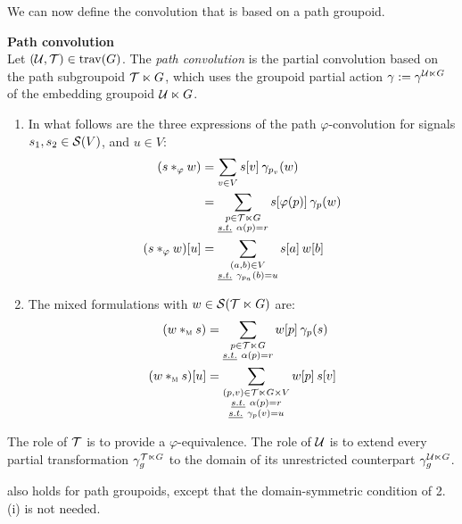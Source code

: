 We can now define the convolution that is based on a path groupoid.

\begin{definition}\textbf{Path convolution}\\
Let $(\cu, \ct) \in \tree(G)$. The \emph{path convolution} is the partial convolution based on the path subgroupoid $\ct \ltimes G$, which uses the groupoid partial action $\gamma := \gamma^{\cu \ltimes G}$ of the embedding groupoid $\cu \ltimes G$.
\begin{enumerate}[label=(\roman*)]
  \item In what follows are the three expressions of the path $\varphi$-convolution for signals $s_1, s_2 \in \cs(V)$, and $u \in V$:
\begin{align*}
(s \ast_\varphi w) & = \displaystyle\sum_{v \in V} s[v] \h{2} \gamma_{p_v}(w)\\
                   & = \displaystyle\sum_{\substack{p \in \ct \ltimes G\\ \st \alpha(p) = r}} s[\varphi(p)] \h{2} \gamma_{p}(w)\\
(s \ast_\varphi w)[u] & = \displaystyle\sum_{\substack{(a,b) \in V\\ \st \gamma_{p_a}(b)=u}} s[a] \h{2} w[b]
\end{align*}
  \item The mixed formulations with $w \in \cs(\ct \ltimes G)$ are:
\begin{align*}
(w \ast_{\M} s) & = \displaystyle\sum_{\substack{p \in \ct \ltimes G\\ \st \alpha(p) = r}} w[p] \h{2} \gamma_{p}(s)\\
(w \ast_{\M} s)[u] & = \displaystyle\sum_{\substack{(p,v) \in \ct \ltimes G \times V\\ \st \alpha(p) = r\\ \st \gamma_{p}(v)=u}} w[p] \h{2} s[v]
\end{align*}
\end{enumerate}
\end{definition}

\begin{remark}The role of $\ct$ is to provide a $\varphi$-equivalence. The role of $\cu$ is to extend every partial transformation $\gamma^{\ct \ltimes G}_g$ to the domain of its unrestricted counterpart $\gamma^{\cu \ltimes G}_g$.
\end{remark}

 also holds for path groupoids, except that the domain-symmetric condition of 2.(i) is not needed.

